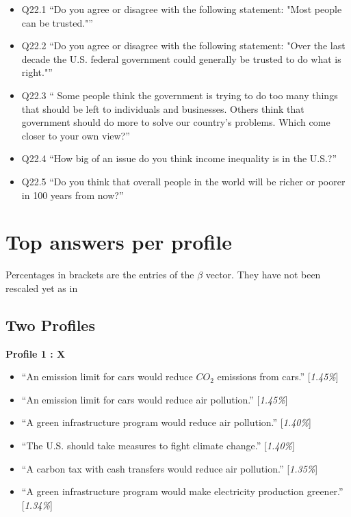 \documentclass{article}
\begin{document}
\begin{itemize}
    \item Q22.1 ``Do you agree or disagree with the following statement: "Most people can be trusted."''
    \item Q22.2 ``Do you agree or disagree with the following statement: "Over the last decade the U.S. federal government could generally be trusted to do what is right."''
    \item Q22.3 `` Some people think the government is trying to do too many things that should be left to individuals and businesses. Others think that government should do more to solve our country's problems. Which come closer to your own view?''
    \item Q22.4 ``How big of an issue do you think income inequality is in the U.S.?''
    \item Q22.5 ``Do you think that overall people in the world will be richer or poorer in 100 years from now?''
\end{itemize}


\section{Top answers per profile}
Percentages in brackets are the entries of the $\beta$ vector. They have not been rescaled yet as in \cite{draca2020polarized}
\subsection{Two Profiles}

\textbf{Profile 1 : X}

\begin{itemize}
    \item ``An emission limit for cars would reduce $CO_2$ emissions from cars.'' [\textit{1.45\%}]
    \item ``An emission limit for cars would reduce air pollution.'' [\textit{1.45\%}]
    \item ``A green infrastructure program would reduce air pollution.'' [\textit{1.40\%}]
    \item ``The U.S. should take measures to fight climate change.'' [\textit{1.40\%}]
    \item ``A carbon tax with cash transfers would reduce air pollution.'' [\textit{1.35\%}]
    \item ``A green infrastructure program would make electricity production greener.'' [\textit{1.34\%}]
\end{itemize}
\end{document}
